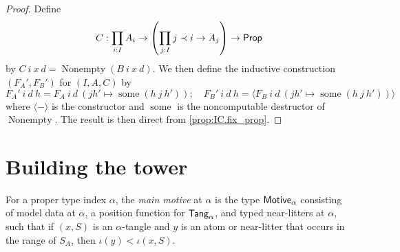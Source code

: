 \begin{proof}
  Define
  \[ C : \prod_{i : I} A_i \to \left(\prod_{j : I} j \prec i \to A_j\right) \to \mathsf{Prop} \]
  by \( C\ i\ x\ d = \operatorname{Nonempty}(B\ i\ x\ d) \).
  We then define the inductive construction \( (F_A', F_B') \) for \( (I, A, C) \) by
  \[ F_A'\ i\ d\ h = F_A\ i\ d\ (j h' \mapsto \operatorname{some}(h\ j\ h'));\quad F_B'\ i\ d\ h = \langle F_B\ i\ d\ (j h' \mapsto \operatorname{some}(h\ j\ h')) \rangle \]
  where \( \langle-\rangle \) is the constructor and \( \operatorname{some} \) is the noncomputable destructor of \( \operatorname{Nonempty} \).
  The result is then direct from \cref{prop:IC.fix_prop}.
\end{proof}

\section{Building the tower}
\begin{definition}
  \label{def:MainMotive}
  For a proper type index \( \alpha \), the \emph{main motive} at \( \alpha \) is the type \( \mathsf{Motive}_\alpha \) consisting of model data at \( \alpha \), a position function for \( \mathsf{Tang}_\alpha \), and typed near-litters at \( \alpha \), such that if \( (x, S) \) is an \( \alpha \)-tangle and \( y \) is an atom or near-litter that occurs in the range of \( S_A \), then \( \iota(y) < \iota(x, S) \).
\end{definition}

